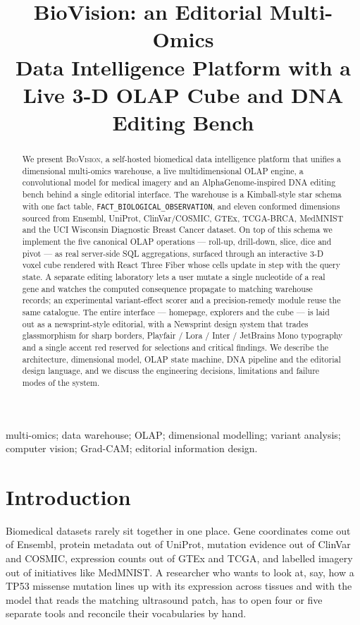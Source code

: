 \documentclass[conference,10pt]{IEEEtran}
\title{BioVision: an Editorial Multi-Omics\\
       Data Intelligence Platform with a\\
       Live 3-D OLAP Cube and DNA Editing Bench}
\author{\IEEEauthorblockN{Maitrey Bharambe,\quad Soham Gaikwad,\quad
                          Om Wagale,\quad Harsh Savnerkar}
        \IEEEauthorblockA{Department of Computer Engineering\\
        \textit{(Undergraduate Research Project, 2026)}}}
\begin{document}
\maketitle

\begin{abstract}
We present \textsc{BioVision}, a self-hosted biomedical data intelligence
platform that unifies a dimensional multi-omics warehouse, a live
multidimensional OLAP engine, a convolutional model for medical imagery
and an AlphaGenome-inspired DNA editing bench behind a single editorial
interface. The warehouse is a Kimball-style star schema with one fact
table, \texttt{FACT\_BIOLOGICAL\_OBSERVATION}, and eleven conformed
dimensions sourced from Ensembl, UniProt, ClinVar/COSMIC, GTEx, TCGA-BRCA,
MedMNIST and the UCI Wisconsin Diagnostic Breast Cancer dataset. On top of
this schema we implement the five canonical OLAP operations
--- roll-up, drill-down, slice, dice and pivot --- as real server-side
SQL aggregations, surfaced through an interactive 3-D voxel cube rendered
with React Three Fiber whose cells update in step with the query state.
A separate editing laboratory lets a user mutate a single nucleotide of a
real gene and watches the computed consequence propagate to matching
warehouse records; an experimental variant-effect scorer and a
precision-remedy module reuse the same catalogue. The entire
interface --- homepage, explorers and the cube --- is laid out as a
newsprint-style editorial, with a Newsprint design system that trades
glassmorphism for sharp borders, Playfair / Lora / Inter / JetBrains Mono
typography and a single accent red reserved for selections and critical
findings. We describe the architecture, dimensional model, OLAP state
machine, DNA pipeline and the editorial design language, and we discuss
the engineering decisions, limitations and failure modes of the system.
\end{abstract}

\begin{IEEEkeywords}
multi-omics; data warehouse; OLAP; dimensional modelling; variant
analysis; computer vision; Grad-CAM; editorial information design.
\end{IEEEkeywords}

\section{Introduction}
Biomedical datasets rarely sit together in one place. Gene coordinates
come out of Ensembl, protein metadata out of UniProt, mutation evidence
out of ClinVar and COSMIC, expression counts out of GTEx and TCGA, and
labelled imagery out of initiatives like MedMNIST. A researcher who wants
to look at, say, how a TP53 missense mutation lines up with its
expression across tissues and with the model that reads the matching
ultrasound patch, has to open four or five separate tools and reconcile
their vocabularies by hand.
\end{document}
